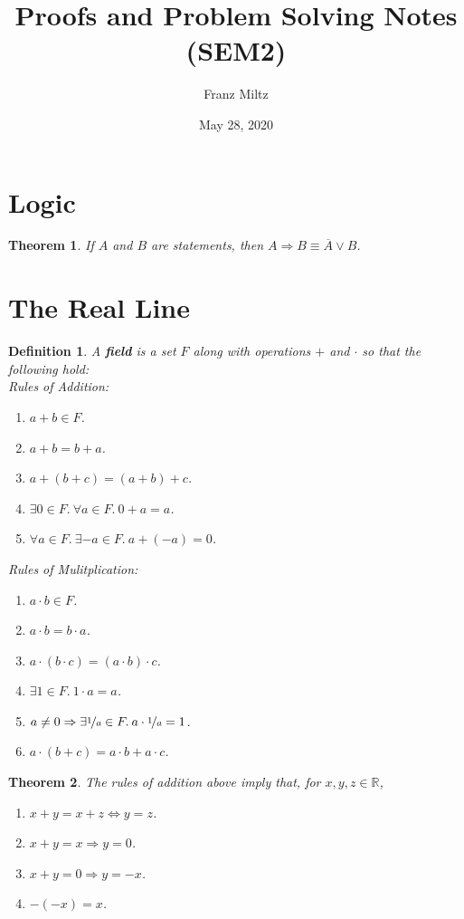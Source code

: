 \documentclass{article}
\theoremstyle{sltheorem}
\newtheorem{definition}{Definition}[section]
\newtheorem{theorem}{Theorem}[section]
\newcommand{\R}{\mathbb{R}}
\newcommand*\lneg[1]{\overline{#1}}
\newcommand*\B[1]{\textbf{#1}}
\begin{document}
\title{Proofs and Problem Solving Notes (SEM2)}
\author{Franz Miltz}
\date{May 28, 2020}
\maketitle
\tableofcontents
\section{Logic}
\begin{theorem}
    If $A$ and $B$ are statements, then $A\Rightarrow B\equiv \lneg{A}\vee B$.
\end{theorem}
\section{The Real Line}
\begin{definition}
    A \B{field} is a set $F$ along with operations $+$ and $\cdot$ so that the following hold:\\
    Rules of Addition:
    \begin{enumerate}
        \item $a+b\in F$.
        \item $a+b = b+a$.
        \item $a+(b+c) = (a+b)+c$.
        \item $\exists 0\in F.\: \forall a\in F.\: 0+a=a$.
        \item $\forall a\in F.\: \exists -a\in F.\: a+(-a)=0$.
    \end{enumerate}
    Rules of Mulitplication:
    \begin{enumerate}
        \item $a\cdot b \in F$.
        \item $a\cdot b = b\cdot a$.
        \item $a\cdot(b\cdot c)=(a\cdot b)\cdot c$.
        \item $\exists 1\in F.\: 1\cdot a = a$.
        \item $a\not=0\Rightarrow\exists \nicefrac{1}{a}\in F.\: a\cdot\nicefrac{1}{a}=1$.
        \item $a\cdot (b+c) = a\cdot b + a\cdot c$.
    \end{enumerate}
\end{definition}
\begin{theorem}
    The rules of addition above imply that, for $x,y,z\in \R$,
    \begin{enumerate}
        \item $x+y=x+z\Leftrightarrow y=z$.
        \item $x+y=x\Rightarrow y=0$.
        \item $x+y=0\Rightarrow y=-x$.
        \item $-(-x)=x$.
    \end{enumerate}
\end{theorem}
\end{document}
